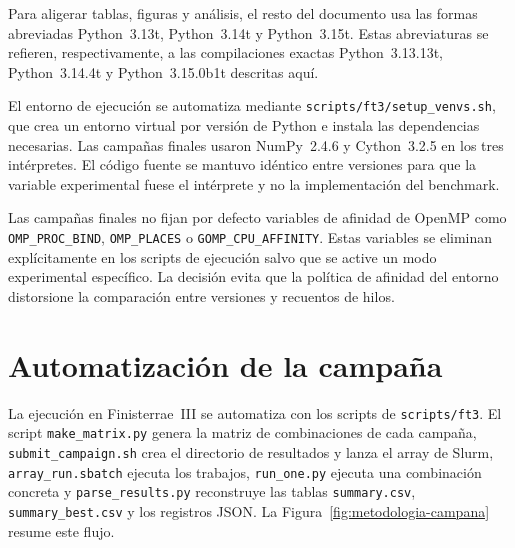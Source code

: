 Para aligerar tablas, figuras y análisis, el resto del documento usa las formas
abreviadas Python~3.13t, Python~3.14t y Python~3.15t. Estas abreviaturas se
refieren, respectivamente, a las compilaciones exactas Python~3.13.13t,
Python~3.14.4t y Python~3.15.0b1t descritas aquí.

El entorno de ejecución se automatiza mediante
\texttt{scripts/ft3/setup\_venvs.sh}, que crea un entorno virtual por versión
de Python e instala las dependencias necesarias. Las campañas finales usaron
NumPy~2.4.6 y Cython~3.2.5 en los tres intérpretes. El código fuente se mantuvo
idéntico entre versiones para que la variable experimental fuese el intérprete
y no la implementación del benchmark.

Las campañas finales no fijan por defecto variables de afinidad de OpenMP como
\texttt{OMP\_PROC\_BIND}, \texttt{OMP\_PLACES} o
\texttt{GOMP\_CPU\_AFFINITY}. Estas variables se eliminan explícitamente en los
scripts de ejecución salvo que se active un modo experimental específico. La
decisión evita que la política de afinidad del entorno distorsione la
comparación entre versiones y recuentos de hilos.


\section{Automatización de la campaña}
\label{sec:automatizacion-campana}

La ejecución en Finisterrae~III se automatiza con los scripts de
\texttt{scripts/ft3}. El script \texttt{make\_matrix.py} genera la matriz de
combinaciones de cada campaña, \texttt{submit\_campaign.sh} crea el directorio
de resultados y lanza el array de Slurm, \texttt{array\_run.sbatch} ejecuta los
trabajos, \texttt{run\_one.py} ejecuta una combinación concreta y
\texttt{parse\_results.py} reconstruye las tablas \texttt{summary.csv},
\texttt{summary\_best.csv} y los registros JSON. La
Figura~\ref{fig:metodologia-campana} resume este flujo.

